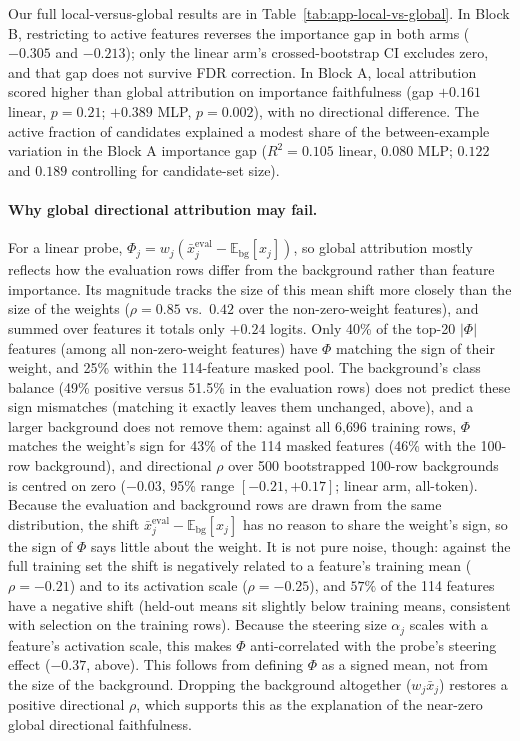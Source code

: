 Our full local-versus-global results are in Table~\ref{tab:app-local-vs-global}. In Block B, restricting to active features reverses the importance gap in both arms ($-0.305$ and $-0.213$); only the linear arm's crossed-bootstrap CI excludes zero, and that gap does not survive FDR correction. In Block A, local attribution scored higher than global attribution on importance faithfulness (gap $+0.161$ linear, $p=0.21$; $+0.389$ MLP, $p=0.002$), with no directional difference. The active fraction of candidates explained a modest share of the between-example variation in the Block A importance gap ($R^2=0.105$ linear, $0.080$ MLP; $0.122$ and $0.189$ controlling for candidate-set size).

\paragraph{Why global directional attribution may fail.} For a linear probe, $\Phi_j = w_j(\bar{x}_j^{\text{eval}} - \mathbb{E}_{\text{bg}}[x_j])$, so global attribution mostly reflects how the evaluation rows differ from the background rather than feature importance. Its magnitude tracks the size of this mean shift more closely than the size of the weights ($\rho = 0.85$ vs.\ $0.42$ over the non-zero-weight features), and summed over features it totals only $+0.24$ logits. Only 40\% of the top-20 $|\Phi|$ features (among all non-zero-weight features) have $\Phi$ matching the sign of their weight, and 25\% within the 114-feature masked pool. The background's class balance (49\% positive versus 51.5\% in the evaluation rows) does not predict these sign mismatches (matching it exactly leaves them unchanged, above), and a larger background does not remove them: against all 6{,}696 training rows, $\Phi$ matches the weight's sign for 43\% of the 114 masked features (46\% with the 100-row background), and directional $\rho$ over 500 bootstrapped 100-row backgrounds is centred on zero ($-0.03$, 95\% range $[-0.21,+0.17]$; linear arm, all-token). Because the evaluation and background rows are drawn from the same distribution, the shift $\bar{x}_j^{\text{eval}}-\mathbb{E}_{\text{bg}}[x_j]$ has no reason to share the weight's sign, so the sign of $\Phi$ says little about the weight. It is not pure noise, though: against the full training set the shift is negatively related to a feature's training mean ($\rho=-0.21$) and to its activation scale ($\rho=-0.25$), and $57\%$ of the 114 features have a negative shift (held-out means sit slightly below training means, consistent with selection on the training rows). Because the steering size $\alpha_j$ scales with a feature's activation scale, this makes $\Phi$ anti-correlated with the probe's steering effect ($-0.37$, above). This follows from defining $\Phi$ as a signed mean, not from the size of the background. Dropping the background altogether ($w_j\bar{x}_j$) restores a positive directional $\rho$, which supports this as the explanation of the near-zero global directional faithfulness.


